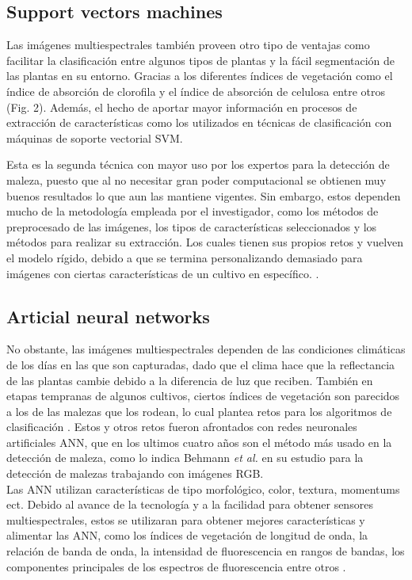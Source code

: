 \documentclass[journal,article,submit,moreauthors,pdftex]{Definitions/mdpi}
\begin{document}
\subsection{Support vectors machines}
Las imágenes  multiespectrales también proveen otro tipo de ventajas como facilitar la clasificación entre algunos tipos de plantas y la fácil segmentación de las plantas en su entorno. Gracias a los diferentes índices de vegetación como el índice de absorción de clorofila y el índice de absorción de celulosa entre otros (Fig. 2). Además, el hecho de aportar mayor información en procesos de extracción de  características como los utilizados en técnicas de clasificación con máquinas de soporte vectorial SVM. 


Esta es la segunda técnica con mayor uso por los expertos para la detección de maleza, puesto que al no necesitar gran poder computacional se obtienen muy buenos resultados lo que aun las mantiene vigentes. Sin embargo, estos dependen mucho de la metodología empleada por el investigador, como los métodos de preprocesado de las imágenes, los tipos de características seleccionados y los métodos para realizar su extracción. Los cuales tienen sus propios retos y vuelven el modelo rígido, debido a que se termina personalizando demasiado para imágenes con ciertas características de un cultivo en específico. \cite{c4}\cite{c10}\cite{c21}.
\subsection{Articial neural networks}
No obstante, las imágenes multiespectrales dependen de las condiciones climáticas de los días en las que son capturadas, dado que el clima hace que la reflectancia de las plantas cambie debido a la diferencia de luz que reciben. También en etapas tempranas de algunos cultivos, ciertos índices de vegetación son parecidos a los de las malezas que los rodean, lo cual plantea retos para los algoritmos de clasificación \cite{c49}. Estos y otros retos fueron afrontados con  redes neuronales artificiales ANN, que en los ultimos cuatro años son el método más usado en la detección de maleza, como lo indica Behmann \textit{et al.} en su estudio para la detección de malezas trabajando con imágenes RGB. 
\\
Las ANN utilizan características de tipo morfológico, color, textura, momentums ect. Debido al avance de la tecnología y a la facilidad para obtener sensores multiespectrales, estos se utilizaran para obtener mejores características y alimentar las ANN, como los índices de vegetación de longitud de onda, la relación de banda de onda, la intensidad de fluorescencia en rangos de bandas, los componentes principales de los espectros de fluorescencia entre otros \cite{c46}.
\\
\end{document}
